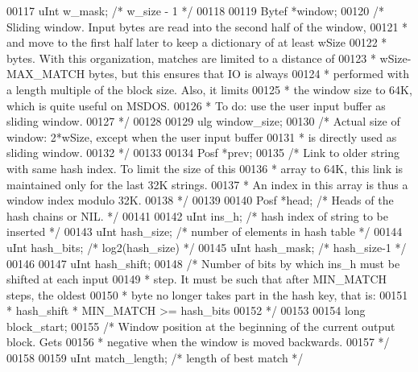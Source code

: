 \begin{DoxyCode}
00117     uInt  w\_mask;        \textcolor{comment}{/* w\_size - 1 */}
00118 
00119     Bytef *window;
00120     \textcolor{comment}{/* Sliding window. Input bytes are read into the second half of the window,}
00121 \textcolor{comment}{     * and move to the first half later to keep a dictionary of at least wSize}
00122 \textcolor{comment}{     * bytes. With this organization, matches are limited to a distance of}
00123 \textcolor{comment}{     * wSize-MAX\_MATCH bytes, but this ensures that IO is always}
00124 \textcolor{comment}{     * performed with a length multiple of the block size. Also, it limits}
00125 \textcolor{comment}{     * the window size to 64K, which is quite useful on MSDOS.}
00126 \textcolor{comment}{     * To do: use the user input buffer as sliding window.}
00127 \textcolor{comment}{     */}
00128 
00129     ulg window\_size;
00130     \textcolor{comment}{/* Actual size of window: 2*wSize, except when the user input buffer}
00131 \textcolor{comment}{     * is directly used as sliding window.}
00132 \textcolor{comment}{     */}
00133 
00134     Posf *prev;
00135     \textcolor{comment}{/* Link to older string with same hash index. To limit the size of this}
00136 \textcolor{comment}{     * array to 64K, this link is maintained only for the last 32K strings.}
00137 \textcolor{comment}{     * An index in this array is thus a window index modulo 32K.}
00138 \textcolor{comment}{     */}
00139 
00140     Posf *head; \textcolor{comment}{/* Heads of the hash chains or NIL. */}
00141 
00142     uInt  ins\_h;          \textcolor{comment}{/* hash index of string to be inserted */}
00143     uInt  hash\_size;      \textcolor{comment}{/* number of elements in hash table */}
00144     uInt  hash\_bits;      \textcolor{comment}{/* log2(hash\_size) */}
00145     uInt  hash\_mask;      \textcolor{comment}{/* hash\_size-1 */}
00146 
00147     uInt  hash\_shift;
00148     \textcolor{comment}{/* Number of bits by which ins\_h must be shifted at each input}
00149 \textcolor{comment}{     * step. It must be such that after MIN\_MATCH steps, the oldest}
00150 \textcolor{comment}{     * byte no longer takes part in the hash key, that is:}
00151 \textcolor{comment}{     *   hash\_shift * MIN\_MATCH >= hash\_bits}
00152 \textcolor{comment}{     */}
00153 
00154     \textcolor{keywordtype}{long} block\_start;
00155     \textcolor{comment}{/* Window position at the beginning of the current output block. Gets}
00156 \textcolor{comment}{     * negative when the window is moved backwards.}
00157 \textcolor{comment}{     */}
00158 
00159     uInt match\_length;           \textcolor{comment}{/* length of best match */}

\end{DoxyCode}
